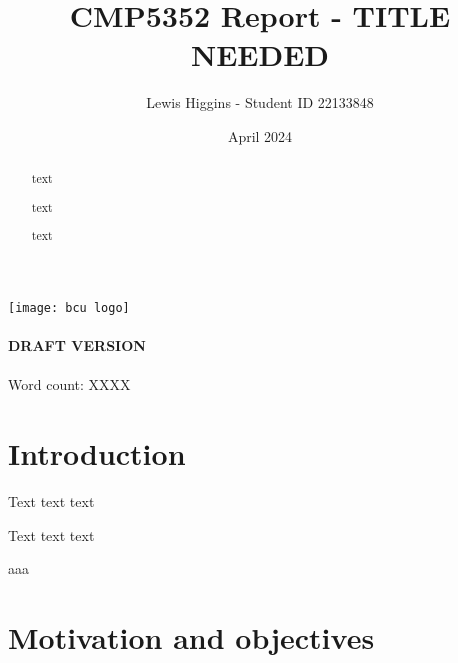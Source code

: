 \documentclass[12pt]{report}
\title{CMP5352 Report - TITLE NEEDED}
\author{Lewis Higgins - Student ID 22133848}
\date{April 2024}
\begin{document}
    \pagecolor{yellow} %

    \makeatletter
    \begin{titlepage}
        \begin{center}
            \texttt{[image: bcu logo]}\\[4ex]
            {\large \bfseries  \@title }\\[2ex]
            {\large \bfseries  DRAFT VERSION }\\[2ex]
            {\@author}\\[30ex]
            {Word count: XXXX}\\[20ex]
        \end{center}
    \end{titlepage}
    \makeatother
    \thispagestyle{empty}
    \newpage

    \pagecolor{white}

    \begin{abstract}
        text

        text

        text

    \end{abstract}

    \setcounter{page}{0} %

    \tableofcontents
    \thispagestyle{empty}

    \chapter*{Introduction}\label{ch:introduction}

    Text text text

    Text text text

    \pagebreak

    aaa

    \chapter*{Motivation and objectives}\label{ch:sec1}


    

    \pagebreak
\end{document}
